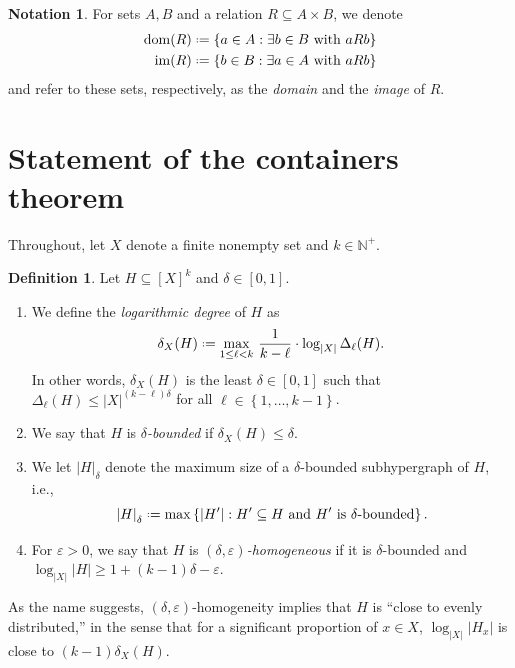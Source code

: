 \documentclass[12pt,reqno]{amsart}
\theoremstyle{plain}
\theoremstyle{definition}
\newtheorem{defn}[equation]{Definition}
\newtheorem{notation}[equation]{Notation}
\theoremstyle{remark}
\newcommand{\0}{\mathbb{\emptyset}}
\newcommand{\N}{\mathbb{N}}
\newcommand{\set}[1]{\left\{ #1 \right\}}
\newcommand*{\defeq}{\mathrel{\vcenter{\baselineskip0.5ex \lineskiplimit0pt \hbox{\scriptsize.}\hbox{\scriptsize.}}}=}
\newcommand{\de}{\delta}
\newcommand{\De}{\Delta}
\newcommand{\e}{\varepsilon}
\newcommand{\dom}{\mathrm{dom}}
\newcommand{\im}{\mathrm{im}}
\newcommand{\logX}{\log_{|X|}}
\newcommand{\capsize}[2]{\left|#2\right|_{#1}}
\newcommand{\ldeg}{\de_X}
\begin{document}
\begin{notation}
	For sets $A,B$ and a relation $R \subseteq A \times B$, we denote
	\begin{align*}
	\dom(R) &\defeq \set{a \in A : \exists b \in B \text{ with } a R b}
	\\
	\im(R) &\defeq \set{b \in B : \exists a \in A \text{ with } a R b}
	\end{align*}
	and refer to these sets, respectively, as the \emph{domain} and the \emph{image} of $R$.
	
\end{notation}

\section{Statement of the containers theorem}\label{sec:statement}

\noindent Throughout, let $X$ denote a finite nonempty set and $k \in \N^+$.

\begin{defn}\label{defn:hypergraphs:advanced}
	Let $H \subseteq [X]^k$ and $\de \in [0,1]$.
	
	\begin{enumerate}[label=\textup{(\ref*{defn:hypergraphs:advanced}.\alph*)}, itemsep=4pt,leftmargin=*,series=defn:hypergraphs:advanced]
		\item \label{defn:hypergraphs:log-degree} We define the \emph{logarithmic degree} of $H$ as
		\[
		\ldeg(H) \defeq \max_{1 \le \ell < k} \, \frac{1}{k - \ell} \cdot \logX \De_\ell(H).
		\]
		In other words, $\ldeg(H)$ is the least $\de \in [0,1]$ such that $\De_\ell(H) \le |X|^{(k - \ell) \de}$ for all $\ell \in \set{1, \hdots, k-1}$.
		
		\item \label{defn:hypergraphs:bounded} We say that $H$ is \emph{$\de$-bounded} if $\ldeg(H) \le \de$. 
		
		\item \label{defn:hypergraphs:capsize} We let $\capsize{\de}{H}$ denote the maximum size of a $\de$-bounded subhypergraph of $H$, i.e.,
		\[
		\capsize{\de}{H} \defeq \max \set{|H'| : H' \subseteq H\text{ and $H'$ is $\de$-bounded}}.
		\]
		
		\item \label{defn:hypergraphs:homogenous} For $\e > 0$, we say that $H$ is \emph{$(\de, \e)$-homogeneous} if it is $\de$-bounded and $\logX |H| \ge 1 + (k-1) \de - \e$.
	\end{enumerate}
\end{defn}
As the name suggests, $(\delta,\e)$-homogeneity implies that $H$ is ``close to evenly distributed,'' in the sense that for a significant proportion of $x\in X$, $\log_{|X|}|H_x|$ is close to $(k-1)\delta_X(H)$.
\end{document}
